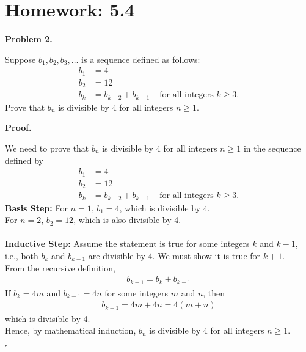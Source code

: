 \documentclass{article}
\newenvironment{problem}[1]{
    \begin{mdframed}[backgroundcolor=gray!20, skipabove=\baselineskip, skipbelow=\baselineskip, nobreak=true, innerleftmargin=10pt, innerrightmargin=10pt, innertopmargin=10pt, innerbottommargin=10pt]
    \textbf{Problem #1.}
}{
    \end{mdframed}
}
\newenvironment{proof}{
    \begin{mdframed}[nobreak=false, innerleftmargin=10pt, innerrightmargin=10pt, innertopmargin=10pt, innerbottommargin=10pt]
    \textbf{Proof.}
}{
    \hfill $\square$
    \end{mdframed}
}
\begin{document}
\newpage \section{Homework: 5.4}
    \begin{problem}{2}
        Suppose $b_1, b_2, b_3, \ldots$ is a sequence defined as follows:
        \begin{align*}
            b_1 &= 4 \\
            b_2 &= 12 \\
            b_k &= b_{k-2} + b_{k-1} & \text{ for all integers } k \geq 3.
        \end{align*}
        Prove that $b_n$ is divisible by $4$ for all integers $n \geq 1$.
    \end{problem}
    \begin{proof}
        We need to prove that $b_n$ is divisible by 4 for all integers $n \geq 1$ in the sequence defined by
        \begin{align*}
            b_1 &= 4 \\
            b_2 &= 12 \\
            b_k &= b_{k-2} + b_{k-1} & \text{ for all integers } k \geq 3.
        \end{align*}
        \textbf{Basis Step:}
        For $n = 1$, $b_1 = 4$, which is divisible by 4. \\
        For $n = 2$, $b_2 = 12$, which is also divisible by 4. \\ \\
        \textbf{Inductive Step:}
        Assume the statement is true for some integers $k$ and $k-1$, i.e., both $b_k$ and $b_{k-1}$ are divisible by 4. We must show it is true for $k+1$. \\
        From the recursive definition,
        \begin{align*}
            b_{k+1} = b_k + b_{k-1}
        \end{align*}
        If $b_k = 4m$ and $b_{k-1} = 4n$ for some integers $m$ and $n$, then
        \begin{align*}
            b_{k+1} = 4m + 4n = 4(m + n)
        \end{align*}
        which is divisible by 4. \\
        Hence, by mathematical induction, $b_n$ is divisible by 4 for all integers $n \geq 1$.
    \end{proof}
\end{document}

